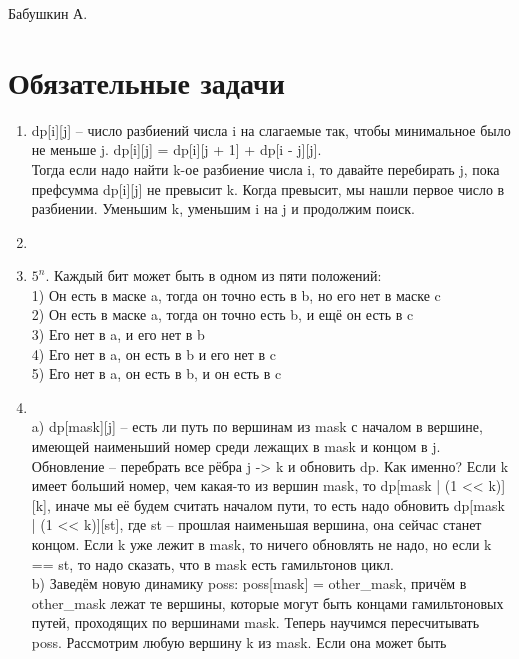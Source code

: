 \documentclass[12pt]{article}
\begin{document}
\def\t{\texttt}

Бабушкин А.

\section{Обязательные задачи}

\begin{enumerate}
	\setlength{\parskip}{0pt} 
	\setlength{\itemsep}{0pt} 
	\item dp[i][j] -- число разбиений числа i на слагаемые так, чтобы минимальное было не 
    меньше j. dp[i][j] = dp[i][j + 1] + dp[i - j][j]. \\
    Тогда если надо найти k-ое разбиение числа i, то давайте перебирать j, пока префсумма 
    dp[i][j] не превысит k. Когда превысит, мы нашли первое число в разбиении. Уменьшим 
    k, уменьшим i на j и продолжим поиск. \\
    \item ~ \\
    \item $5^n$. Каждый бит может быть в одном из пяти положений: \\
    1) Он есть в маске a, тогда он точно есть в b, но его нет в маске c \\
    2) Он есть в маске a, тогда он точно есть b, и ещё он есть в c \\
    3) Его нет в a, и его нет в b \\
    4) Его нет в a, он есть в b и его нет в c \\
    5) Его нет в a, он есть в b, и он есть в c \\
    \item ~\\
    a) dp[mask][j] -- есть ли путь по вершинам из mask с началом в вершине, имеющей 
    наименьший номер среди лежащих в mask и концом в j. 
    Обновление -- перебрать все рёбра j -> k и обновить dp. Как именно? Если k имеет больший 
    номер, чем какая-то из вершин mask, то dp[mask | (1 << k)][k], иначе мы её будем считать 
    началом пути, то есть надо обновить dp[mask | (1 << k)][st], где st -- прошлая наименьшая 
    вершина, она сейчас станет концом. Если k уже лежит в mask, то ничего обновлять не надо, 
    но если k == st, то надо сказать, что в mask есть гамильтонов цикл. \\
    b) Заведём новую динамику poss: poss[mask] = other\_mask, причём в other\_mask лежат те 
    вершины, которые могут быть концами гамильтоновых путей, проходящих по вершинами mask. 
    Теперь научимся пересчитывать poss. Рассмотрим любую вершину k из mask. Если она может быть 

\end{enumerate}
\end{document}
